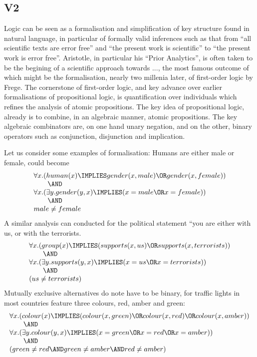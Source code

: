 \subsection{V2}
Logic can be seen as a formalisation and simplification of key
structure found in natural language, in particular of formally valid
inferences such as that from ``all scientific texts are error free''
and ``the present work is scientific'' to ``the present work is error
free''. Aristotle, in particular his ``Prior Analytics'', is often
taken to be the begining of a scientific approach towards ..., the
most famous outcome of which might be the formalisation, nearly two
millenia later, of first-order logic by Frege.  The cornerstone of
first-order logic, and key advance over earlier formalisations of
propositional logic, is quantification over individuals which refines
the analysis of atomic propositions.  The key idea of propositional
logic, already is to combine, in an algebraic manner, atomic
propositions. The key algebraic combinators are, on one hand unary
negation, and on the other, binary operators such as conjunction,
disjunction and implication.

Let us consider some examples of formalisation: Humans are either male or female,
could become
\[
   \begin{array}{l}
   \forall x. (human(x) \IMPLIES gender(x, male) \OR gender(x, female)) \\
   \qquad\AND        \\
   \forall x.( \exists y.gender(y, x) \IMPLIES ( x = male \OR x = female )) \\
   \qquad\AND \\
   male \neq female
   \end{array}
\]
A similar analysis can conducted for the political statement ``you are
either with us, or with the terrorists.
\[
   \begin{array}{l}
   \forall x.(group(x) \IMPLIES ( supports(x, us) \OR supports(x, terrorists)) \\
   \qquad\AND\\
   \forall x.( \exists y.supports(y, x) \IMPLIES ( x = us \OR x = terrorists )) \\
   \qquad\AND\\
   ( us \neq terrorists)
   \end{array}
\]
Mutually exclusive alternatives do note have to be binary, for traffic
lights in most countries feature three colours, red, amber and green:
\[
   \begin{array}{l}
   \forall x.(colour(x) \IMPLIES ( colour(x, green) \OR colour(x, red) \OR colour(x, amber)) \\
   \qquad\AND\\
   \forall x.( \exists y.colour(y, x) \IMPLIES ( x = green \OR x = red \OR x = amber )) \\
   \qquad\AND\\
   ( green \neq red \AND green \neq amber \AND red \neq amber)
   \end{array}
\]

